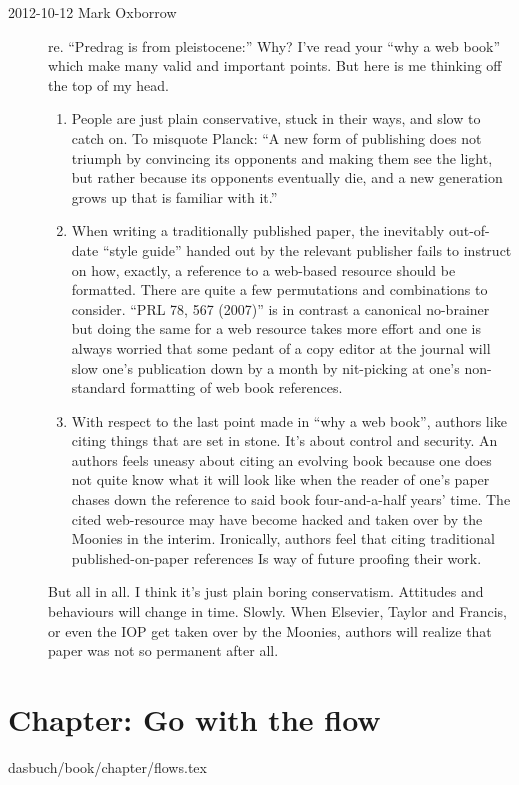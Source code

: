 \begin{description}
\item[2012-10-12 Mark Oxborrow] re. ``Predrag is from pleistocene:''
Why? I've read your ``why a web book'' which make many valid and
important points. But here is me thinking off the top of my head.
\begin{enumerate}
    \item
People are just plain conservative, stuck in their ways, and slow to
catch on.  To misquote Planck: ``A new form of publishing does not
triumph by convincing its opponents and making them see the light, but
rather because its opponents eventually die, and a new generation grows
up that is familiar with it.''
    \item
When writing a traditionally published paper, the inevitably out-of-date
``style guide'' handed out by the relevant publisher fails to instruct on
how, exactly, a reference to a web-based resource should be formatted.
There are quite a few permutations and combinations to consider. ``PRL
78, 567 (2007)'' is in contrast a canonical no-brainer but doing the same
for a web resource takes more effort and one is always worried that some
pedant of a copy editor at the journal will slow one's publication down
by a month by nit-picking at one's non-standard formatting of web book
references.
    \item
With respect to the last point made in ``why a web book'', authors like
citing things that are set in stone. It's about control and security. An
authors feels uneasy about citing an evolving book because one does not
quite know what it will look like when the reader of one's paper chases
down the reference to said book four-and-a-half years' time.  The cited
web-resource may have become hacked and taken over by the Moonies in the
interim.  Ironically, authors feel that citing traditional
published-on-paper references Is way of future proofing their work.
\end{enumerate}
But all in all. I think it's just plain boring conservatism. Attitudes
and behaviours will change in time. Slowly. When Elsevier, Taylor and
Francis, or even the IOP get taken over by the Moonies, authors will
realize that paper was not so permanent after all.

\end{description}


\section{Chapter: Go with the flow}
\label{c-flows}\noindent dasbuch/book/chapter/flows.tex

